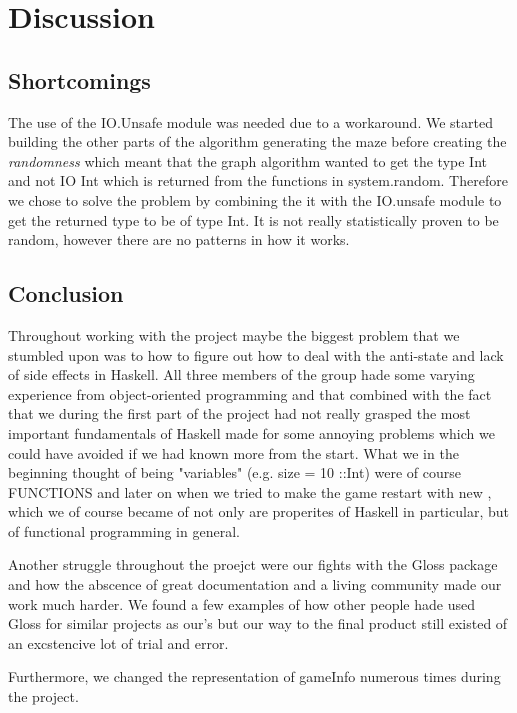 \documentclass[12pt, a4paper]{article}
\begin{document}
\newpage
\section{Discussion}
\subsection{Shortcomings}
The use of the IO.Unsafe module was needed due to a workaround. We started building the other parts of the algorithm generating  the maze  before creating the \textit{randomness} which meant that the graph algorithm wanted to get the type Int and not IO Int which is returned from the functions in system.random. Therefore we chose to solve the problem by combining the it  with the IO.unsafe module to get the returned type to be of type Int. It is not really statistically proven to be random, however there are no patterns in how it works.








\subsection{Conclusion}
Throughout working with the project maybe the biggest problem that we stumbled upon was to how to figure out how to deal with the anti-state and lack of side effects in Haskell. All three members of the group hade some varying experience from object-oriented programming and that combined with the fact that we during the first part of the project had not really grasped the most important fundamentals of Haskell made for some annoying problems which we could have avoided if we had known more from the start. What we in the beginning thought of being "variables" (e.g. size = 10 ::Int) were of course FUNCTIONS and later on when we tried to make the game restart with new , which we of course became of not only are properites of Haskell in particular, but of functional programming in general. 

Another struggle throughout the proejct were our fights with the Gloss package and how the abscence of great documentation and a living community made our work much harder. We found a few examples of how other people hade used Gloss for similar projects as our's but our way to the final product still existed of an excstencive lot of trial and error.

Furthermore, we changed the representation of gameInfo numerous times during the project. 
\end{document}
